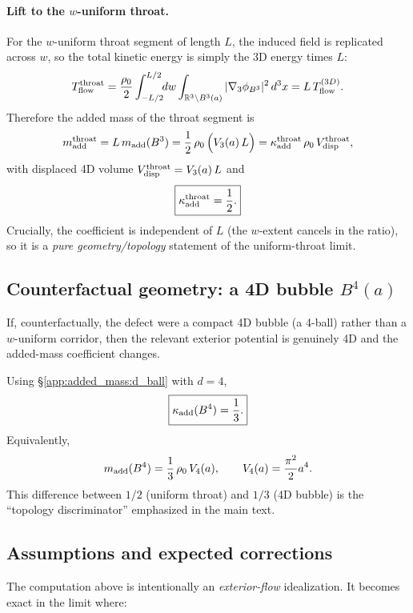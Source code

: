 \documentclass[11pt]{article}
\begin{document}
\paragraph{Lift to the \texorpdfstring{$w$}{w}-uniform throat.}
For the $w$-uniform throat segment of length $L$, the induced field is replicated
across $w$, so the total kinetic energy is simply the 3D energy times $L$:
\begin{align}
T_{\rm flow}^{\rm throat}
=
\frac{\rho_0}{2}\int_{-L/2}^{L/2}\!\!dw
\int_{\mathbb R^3\setminus B^3(a)}
|\nabla_3\phi_{B^3}|^2\,d^3x
=
L\,T_{\rm flow}^{(3D)}.
\end{align}
Therefore the added mass of the throat segment is
\begin{align}
m_{\rm add}^{\rm throat}
=
L\,m_{\rm add}(B^3)
=
\frac{1}{2}\,\rho_0\,\Big(V_3(a)\,L\Big)
=
\kappa_{\rm add}^{\rm throat}\,\rho_0\,V_{\rm disp}^{\rm throat},
\end{align}
with displaced 4D volume $V_{\rm disp}^{\rm throat}=V_3(a)\,L$ and
\begin{align}
\boxed{
\kappa_{\rm add}^{\rm throat}=\frac{1}{2}.
}
\end{align}
Crucially, the coefficient is independent of $L$ (the $w$-extent cancels in the
ratio), so it is a \emph{pure geometry/topology} statement of the uniform-throat
limit.

\subsection{Counterfactual geometry: a 4D bubble \texorpdfstring{$B^4(a)$}{B\string^4(a)}}
\label{app:added_mass:bubble}
If, counterfactually, the defect were a compact 4D bubble (a 4-ball) rather than
a $w$-uniform corridor, then the relevant exterior potential is genuinely 4D and
the added-mass coefficient changes.

Using \S\ref{app:added_mass:d_ball} with $d=4$,
\begin{align}
\boxed{
\kappa_{\rm add}(B^4)=\frac{1}{3}.
}
\end{align}
Equivalently,
\begin{align}
m_{\rm add}(B^4)
=
\frac{1}{3}\,\rho_0\,V_4(a),
\qquad
V_4(a)=\frac{\pi^2}{2}a^4.
\end{align}
This difference between $1/2$ (uniform throat) and $1/3$ (4D bubble) is the
``topology discriminator'' emphasized in the main text.

\subsection{Assumptions and expected corrections}
The computation above is intentionally an \emph{exterior-flow} idealization.
It becomes exact in the limit where:
\end{document}
